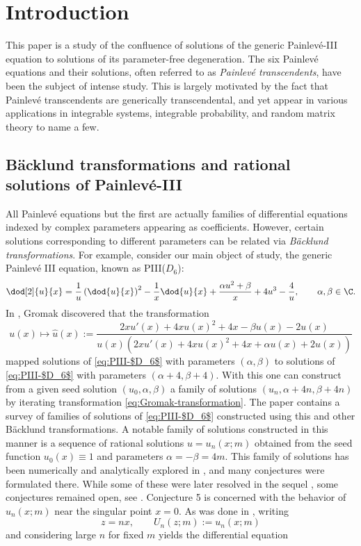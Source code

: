 \section{Introduction}
This paper is a study of the confluence of solutions of the generic Painlev\'e-III equation to solutions of its parameter-free degeneration. The six Painlev\'e equations and their solutions, often referred to as \emph{Painlev\'e transcendents}, have been the subject of intense study. This is largely motivated by the fact that Painlev\'e transcendents are generically transcendental, and yet appear in various applications in integrable systems, integrable probability, and random matrix theory to name a few.

\subsection{B\"acklund transformations and rational solutions of Painlev\'e-III}
All Painlev\'e equations but the first are actually families of differential equations indexed by complex parameters appearing as coefficients. However, certain solutions corresponding to different parameters can be related via \emph{B\"acklund transformations}. For example, consider our main object of study, the generic Painlev\'e III equation, known as PIII($D_6$):
\begin{equation}
\dod[2]{u}{x}=\dfrac{1}{u}\left( \dod{u}{x} \right)^2-\dfrac{1}{x} \dod{u}{x} + \dfrac{\alpha u^2 + \beta}{x}+4u^3-\frac{4}{u}, \qquad \alpha,\beta \in \C.
\label{eq:PIII-$D_6$}
\end{equation}
In \cite{Gromak}, Gromak discovered that the transformation
\begin{equation}
 u(x) \mapsto \hat{u}(x) := \dfrac{2xu'(x) + 4xu(x)^2 + 4x -\beta u(x) - 2u(x)}{u(x) ( 2xu'(x) + 4x u(x)^2 +4x + \alpha u(x) + 2u(x) )}
\label{eq:Gromak-transformation}
\end{equation}
mapped solutions of \eqref{eq:PIII-$D_6$} with parameters $(\alpha, \beta)$ to solutions of \eqref{eq:PIII-$D_6$} with parameters $(\alpha + 4,\allowbreak \beta+4)$. With this one can construct from a given seed solution $(u_0, \alpha, \beta)$ a family of solutions $(u_n, \alpha + 4n, \beta + 4n)$ by iterating transformation \eqref{eq:Gromak-transformation}. The paper \cite{MCB} contains a survey of families of solutions of \eqref{eq:PIII-$D_6$} constructed using this and other B\"acklund transformations. A notable family of solutions constructed in this manner is a sequence of rational solutions $u=u_n(x;m)$ obtained from the seed function $u_0(x) \equiv 1$ and parameters $\alpha = -\beta = 4m$. This family of solutions has been numerically and analytically explored in \cite{BMS18}, and many conjectures were formulated there. While some of these were later resolved in the sequel \cite{BM20}, some conjectures remained open, see \cite[Conjectures 4 and 5]{BMS18}. Conjecture 5 is concerned with the behavior of $u_n(x;m)$ near the singular point $x = 0$. As was done in \cite{BMS18}, writing \[z = nx,\qquad U_n(z;m):= u_n(x;m)\] and considering large $n$ for fixed $m$ yields the differential equation
